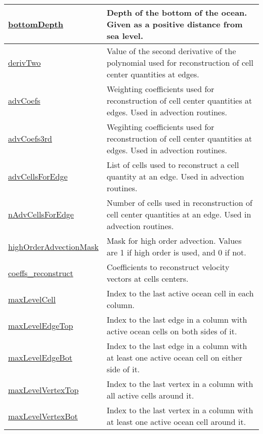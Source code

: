 {\begin{center}
\begin{longtable}{| p{2.0in} | p{4.0in} |}
	\hline
	\hyperref[subsec:var_sec_mesh_bottomDepth]{bottomDepth} & Depth of the bottom of the ocean. Given as a positive distance from sea level. \\
	\hline
	\hyperref[subsec:var_sec_mesh_derivTwo]{derivTwo} & Value of the second derivative of the polynomial used for reconstruction of cell center quantities at edges. \\
	\hline
	\hyperref[subsec:var_sec_mesh_advCoefs]{advCoefs} & Weighting coefficients used for reconstruction of cell center quantities at edges. Used in advection routines. \\
	\hline
	\hyperref[subsec:var_sec_mesh_advCoefs3rd]{advCoefs3rd} & Wegihting coefficients used for reconstruction of cell center quantities at edges. Used in advection routines. \\
	\hline
	\hyperref[subsec:var_sec_mesh_advCellsForEdge]{advCellsForEdge} & List of cells used to reconstruct a cell quantity at an edge. Used in advection routines. \\
	\hline
	\hyperref[subsec:var_sec_mesh_nAdvCellsForEdge]{nAdvCellsForEdge} & Number of cells used in reconstruction of cell center quantities at an edge. Used in advection routines. \\
	\hline
	\hyperref[subsec:var_sec_mesh_highOrderAdvectionMask]{highOrderAdvectionMask} & Mask for high order advection. Values are 1 if high order is used, and 0 if not. \\
	\hline
	\hyperref[subsec:var_sec_mesh_coeffs_reconstruct]{coeffs\_reconstruct} & Coefficients to reconstruct velocity vectors at cells centers. \\
	\hline
	\hyperref[subsec:var_sec_mesh_maxLevelCell]{maxLevelCell} & Index to the last active ocean cell in each column. \\
	\hline
	\hyperref[subsec:var_sec_mesh_maxLevelEdgeTop]{maxLevelEdgeTop} & Index to the last edge in a column with active ocean cells on both sides of it. \\
	\hline
	\hyperref[subsec:var_sec_mesh_maxLevelEdgeBot]{maxLevelEdgeBot} & Index to the last edge in a column with at least one active ocean cell on either side of it. \\
	\hline
	\hyperref[subsec:var_sec_mesh_maxLevelVertexTop]{maxLevelVertexTop} & Index to the last vertex in a column with all active cells around it. \\
	\hline
	\hyperref[subsec:var_sec_mesh_maxLevelVertexBot]{maxLevelVertexBot} & Index to the last vertex in a column with at least one active ocean cell around it. \\

\end{longtable}
\end{center}}
